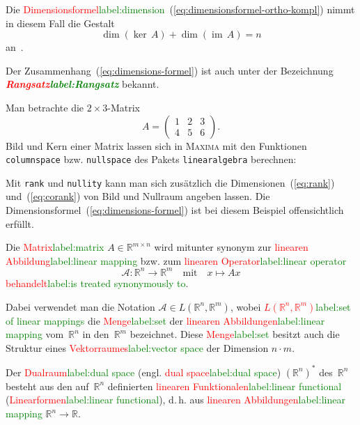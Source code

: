 \documentclass[a4paper,twoside,english,ngerman,deutsch,german,sectrefs,envcountsame,envcountchap]{svmono}
\newcommand{\setref}[2]{\textcolor{red}{#1}\textcolor{green}{#2}}
\begin{document}
Die \setref{Dimensionsformel}{label:dimension}~(\ref{eq:dimensionsformel-ortho-kompl}) nimmt in diesem Fall die Gestalt
\begin{equation}
\dim(\ker\,A)+\dim({\operatorname{im}}\,A)=n\label{eq:dimensions-formel}
\end{equation}
an~\cite{lorenz1992,beutelspacher2001}.

Der Zusammenhang~(\ref{eq:dimensions-formel}) ist auch unter der Bezeichnung \textbf{\em \setref{Rangsatz}{label:Rangsatz}} bekannt.


\begin{example}
\label{exa:Bild-und-Kern}Man betrachte die $2\times3$-Matrix
\[
A=\left(\begin{array}{ccc} 1 & 2 & 3\\ 4 & 5 & 6
\end{array}\right).
\]
Bild und Kern einer Matrix lassen sich in \textsc{Maxima} mit den Funktionen \texttt{columnspace} bzw. \texttt{nullspace} des Pakets
\texttt{linearalgebra} berechnen:



Mit \texttt{rank} und \texttt{nullity} kann man sich zusätzlich die Dimensionen~(\ref{eq:rank}) und~(\ref{eq:corank}) von Bild und Nullraum angeben lassen. Die Dimensionsformel~(\ref{eq:dimensions-formel}) ist bei diesem Beispiel offensichtlich erfüllt.

\end{example}

Die \setref{Matrix}{label:matrix} $A\in{\mathbb{R}}^{m\times n}$ wird mitunter synonym zur \setref{linearen Abbildung}{label:linear mapping} bzw. zum \setref{linearen Operator}{label:linear operator}
\[
\mathcal{A}:{\mathbb{R}}^{n}\to{\mathbb{R}}^{m}\quad\text{mit}\quad x\mapsto Ax
\]
\setref{behandelt}{label:is treated synonymously to}.

Dabei verwendet man die Notation $\mathcal{A}\in L({\mathbb{R}}^{n},{\mathbb{R}}^{m})$, wobei \setref{$L({\mathbb{R}}^{n},{\mathbb{R}}^{m})$}{label:set of linear mappings} die \setref{Menge}{label:set} der \setref{linearen Abbildungen}{label:linear mapping} vom~${\mathbb{R}}^{n}$ in den~${\mathbb{R}}^{m}$ bezeichnet. Diese \setref{Menge}{label:set} besitzt auch die Struktur eines \setref{Vektorraumes}{label:vector space} der Dimension $n\cdot m$.

Der \setref{Dualraum}{label:dual space} (engl. \setref{dual space}{label:dual space}) $({\mathbb{R}}^{n})^{*}$ des~${\mathbb{R}}^{n}$ besteht aus den auf~${\mathbb{R}}^{n}$ definierten \setref{linearen Funktionalen}{label:linear functional} (\setref{Linearformen}{label:linear functional}), d.\,h. aus \setref{linearen Abbildungen}{label:linear mapping} ${\mathbb{R}}^{n}\to{\mathbb{R}}$.
\end{document}
